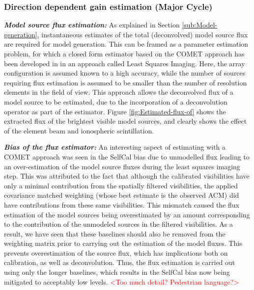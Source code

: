 \documentclass{aa}
\begin{document}
\subsubsection{\label{sub:Direction-dependent-gain}Direction dependent gain estimation
(Major Cycle)}

\textbf{\emph{Model   source  flux   estimation:}}  As   explained   in  Section
\ref{sub:Model-generation}, instantaneous  estimates of the  total (deconvolved)
model source  flux are required for model  generation.  This can be  framed as a
parameter estimation  problem, for  which a closed  form estimator based  on the
COMET  approach has  been  developed in  \citep{wijnholds2008fundamental} in  an
approach called Least Squares Imaging.  Here, the array configuration is assumed
known to a high accuracy, while  the number of sources requiring flux estimation
is assumed to be smaller than the  number of resolution elements in the field of
view.  This  approach allows  the  deconvolved  flux of  a  model  source to  be
estimated, due to  the incorporation of a deconvolution operator  as part of the
estimator. Figure  \ref{fig:Estimated-flux-of} shows  the extracted flux  of the
brightest visible  model sources,  and clearly shows  the effect of  the element
beam and ionospheric scintillation.

\textbf{\emph{Bias  of the  flux  estimator:}}\emph{ }An  interesting aspect  of
estimating with a COMET approach was  seen in the SelfCal bias due to unmodelled
flux leading to  an over-estimation of the model source  fluxes during the least
squares  imaging  step.  This was  attributed  to  the  fact that  although  the
calibrated  visibilities have  only a  minimal contribution  from  the spatially
filtered  visibilities, the  applied  covariance matched  weighting (whose  best
estimate  is  the   observed  ACM)  did  have  contributions   from  these  same
visibilities.  This mismatch  caused the  flux estimation  of the  model sources
being  overestimated by  an  amount  corresponding to  the  contribution of  the
unmodeled sources in  the filtered visibilities. As a result,  we have seen that
these  baselines should  also  be removed  from  the weighting  matrix prior  to
carrying out the estimation of the model fluxes. This prevents overestimation of
the  source  flux,  which has  implications  both  on  calibration, as  well  as
deconvolution. Thus,  the flux estimation is  carried out using  only the longer
baselines, which results  in the SelfCal bias now  being mitigated to acceptably
low levels. \textcolor{red}{<Too much detail?  Pedestrian language?>}
\end{document}

